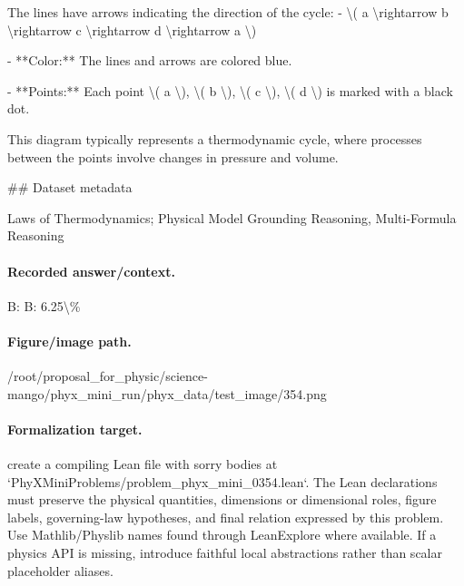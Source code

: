   The lines have arrows indicating the direction of the cycle:
  - \textbackslash{}( a \textbackslash{}rightarrow b \textbackslash{}rightarrow c \textbackslash{}rightarrow d \textbackslash{}rightarrow a \textbackslash{})

- **Color:** The lines and arrows are colored blue.

- **Points:** Each point \textbackslash{}( a \textbackslash{}), \textbackslash{}( b \textbackslash{}), \textbackslash{}( c \textbackslash{}), \textbackslash{}( d \textbackslash{}) is marked with a black dot.

This diagram typically represents a thermodynamic cycle, where processes between the points involve changes in pressure and volume.

\#\# Dataset metadata

Laws of Thermodynamics; Physical Model Grounding Reasoning, Multi-Formula Reasoning

\paragraph{Recorded answer/context.}
B: B: 6.25\textbackslash{}\%

\paragraph{Figure/image path.}
/root/proposal\_for\_physic/science-mango/phyx\_mini\_run/phyx\_data/test\_image/354.png

\paragraph{Formalization target.}
create a compiling Lean file with sorry bodies at `PhyXMiniProblems/problem\_phyx\_mini\_0354.lean`. The Lean declarations must preserve the physical quantities, dimensions or dimensional roles, figure labels, governing-law hypotheses, and final relation expressed by this problem.
Use Mathlib/Physlib names found through LeanExplore where available. If a physics API is missing, introduce faithful local abstractions rather than scalar placeholder aliases.

